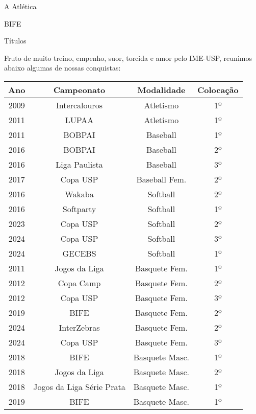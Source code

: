 \begin{secao}{A Atlética}
\begin{subsecao}{BIFE}
\end{subsecao}

\begin{subsecao}{Títulos}

Fruto de muito treino, empenho, suor, torcida e amor pelo IME-USP, reunimos
abaixo algumas de nossas conquistas:

\begin{center}
  \begin{tabular}{|c|c|c|c|}
    \hline
    Ano & Campeonato & Modalidade & Colocação\\
    \hline
    2009 & Intercalouros  & Atletismo       & 1º\\
    2011 & LUPAA          & Atletismo       & 1º\\
    2011 & BOBPAI         & Baseball        & 1º\\
    2016 & BOBPAI         & Baseball        & 2º\\
    2016 & Liga Paulista  & Baseball        & 3º\\
    2017 & Copa USP       & Baseball Fem.   & 2º\\
    2016 & Wakaba         & Softball        & 2º\\
    2016 & Softparty      & Softball        & 1º\\
    2023 & Copa USP       & Softball        & 2º\\
    2024 & Copa USP       & Softball        & 3º\\
    2024 & GECEBS         & Softball        & 1º\\
    2011 & Jogos da Liga  & Basquete Fem.   & 1º\\
    2012 & Copa Camp      & Basquete Fem.   & 2º\\
    2012 & Copa USP       & Basquete Fem.   & 3º\\
    2019 & BIFE           & Basquete Fem.   & 2º\\
    2024 & InterZebras    & Basquete Fem.   & 2º\\
    2024 & Copa USP       & Basquete Fem.   & 3º\\
    2018 & BIFE           & Basquete Masc.  & 1º\\
    2018 & Jogos da Liga  & Basquete Masc.  & 2º\\
    2018 & Jogos da Liga Série Prata & Basquete Masc. & 1º\\
    2019 & BIFE           & Basquete Masc.  & 1º\\

\end{tabular}
\end{center}
\end{subsecao}
\end{secao}
